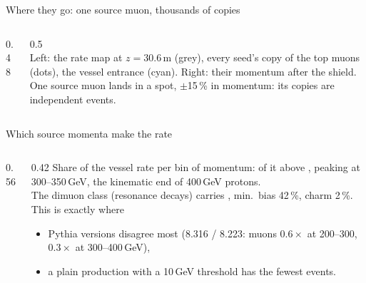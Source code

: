 \documentclass[aspectratio=169,10pt]{beamer}
\newcommand{\sld}[2][\linewidth]{\livewidget{#2}{#1}{0.62cm}}
\begin{document}
\begin{frame}{Where they go: one source muon, thousands of copies}
  \begin{columns}[c]
    \begin{column}{0.48\textwidth}
      \\[0.5mm]
      \sld[0.8\linewidth]{tm_n}
    \end{column}
    \begin{column}{0.5\textwidth}
      \\[1mm]
      \footnotesize
      Left: the rate map at $z=30.6$\,m (grey), every seed's copy of the top muons (dots), the vessel entrance (cyan). Right: their momentum after the shield.\\[1mm]
      One source muon lands in a  spot, $\pm$15\,\% in momentum: its copies are  independent events.
    \end{column}
  \end{columns}
\end{frame}

\begin{frame}{Which source momenta make the rate}
  \begin{columns}[c]
    \begin{column}{0.56\textwidth}
    \end{column}
    \begin{column}{0.42\textwidth}\footnotesize
      Share of the vessel rate per bin of  momentum:  of it above , peaking at 300--350\,GeV, the kinematic end of 400\,GeV protons.\\[1.5mm]
      The dimuon class (resonance decays) carries , min.\ bias 42\,\%, charm 2\,\%.\\[1.5mm]
      This is exactly where
      \begin{itemize}\footnotesize
        \item Pythia versions disagree most (8.316 / 8.223: muons $0.6\times$ at 200--300, $0.3\times$ at 300--400\,GeV),
        \item a plain production with a 10\,GeV threshold has the fewest events.
      \end{itemize}
    \end{column}
  \end{columns}
\end{frame}
\end{document}
